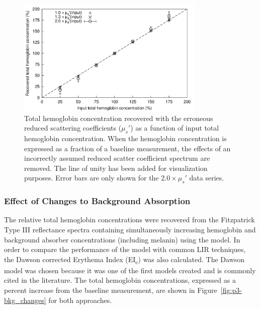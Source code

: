 \begin{figure}
	\centering \includegraphics[width=0.8\textwidth]{figures/p3-incorrect_scatter.png}
	\caption[Total hemoglobin concentration recovered with the erroneous reduced scattering coefficients]{\label{fig:p3-incorrect_scatter}Total hemoglobin concentration recovered with the erroneous reduced scattering coefficients ($\mu_s'$) as a function of input total hemoglobin concentration. When the hemoglobin concentration is expressed as a fraction of a baseline measurement, the effects of an incorrectly assumed reduced scatter coefficient spectrum are removed. The line of unity has been added for visualization purposes. Error bars are only shown for the $2.0 \times \mu_s'$ data series.}
\end{figure}

\subsubsection{Effect of Changes to Background Absorption}
\label{sec:effect_bkg}
The relative total hemoglobin concentrations were recovered from the Fitzpatrick Type III reflectance spectra containing simultaneously increasing hemoglobin and background absorber concentrations (including melanin) using the model. In order to compare the performance of the model with common LIR techniques, the Dawson corrected Erythema Index\cite{Dawson1980} (EI\textsubscript{c}) was also calculated. The Dawson model was chosen because it was one of the first models created and is commonly cited in the literature. The total hemoglobin concentrations, expressed as a percent increase from the baseline measurement, are shown in Figure~\ref{fig:p3-bkg_changes} for both approaches.

